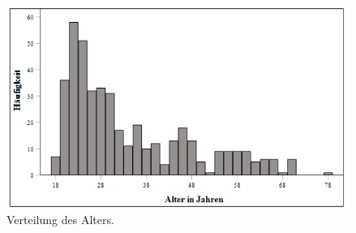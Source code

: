 \begin{figure}[htb]
    \centering
        \includegraphics[width=0.8\linewidth]{Histogramm - Altersverteilung.png}
        \caption[Histogramm Altersverteilung]{Verteilung des Alters.}
        \label{Histogramm Altersverteilung}
\end{figure}

